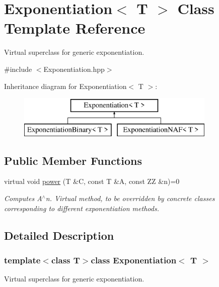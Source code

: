 \hypertarget{classExponentiation}{\section{Exponentiation$<$ T $>$ Class Template Reference}
\label{classExponentiation}
}


Virtual superclass for generic exponentiation.  




{\ttfamily \#include $<$Exponentiation.\-hpp$>$}

Inheritance diagram for Exponentiation$<$ T $>$\-:\begin{figure}[H]
\begin{center}
\leavevmode
\includegraphics[height=2.000000cm]{de/dd5/classExponentiation}
\end{center}
\end{figure}
\subsection*{Public Member Functions}
\begin{DoxyCompactItemize}
\item 
virtual void \hyperlink{classExponentiation_a6bb016d4ff587f16a5369ee70fe39936}{power} (T \&C, const T \&A, const Z\-Z \&n)=0
\begin{DoxyCompactList}\small\item\em Computes A$^\wedge$n. Virtual method, to be overridden by concrete classes corresponding to different exponentiation methods. \end{DoxyCompactList}\end{DoxyCompactItemize}


\subsection{Detailed Description}
\subsubsection*{template$<$class T$>$class Exponentiation$<$ T $>$}

Virtual superclass for generic exponentiation. 

